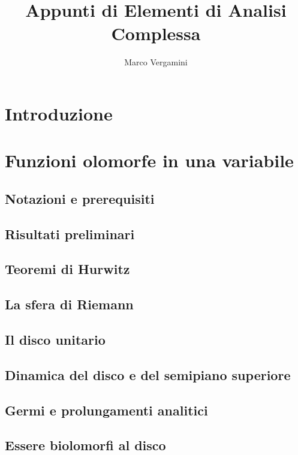 \documentclass{article}
\title{Appunti di Elementi di Analisi Complessa}
\date{}
\author{Marco Vergamini}
\begin{document}
\maketitle
\newpage
\tableofcontents
\newpage


\section{Introduzione}


\newpage

\section{Funzioni olomorfe in una variabile}

\subsection{Notazioni e prerequisiti}


\subsection{Risultati preliminari}


\subsection{Teoremi di Hurwitz}


\subsection{La sfera di Riemann}


\subsection{Il disco unitario}


\subsection{Dinamica del disco e del semipiano superiore}


\subsection{Germi e prolungamenti analitici}


\subsection{Essere biolomorfi al disco}

\end{document}
